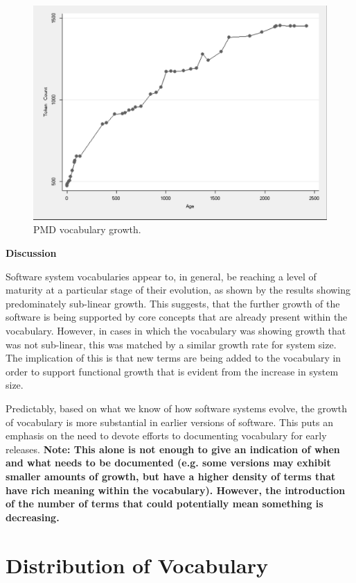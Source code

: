 \begin{figure}[t]
\centering
\includegraphics[width=\textwidth]{Figures/Vocab-PMDGrowth.pdf}
\caption{PMD vocabulary growth.}
\label{fig:vocab-growth-pmd}
\end{figure}

\textbf{Discussion}

Software system vocabularies appear to, in general, be reaching a level of maturity at a particular stage of their evolution, as shown by the results showing predominately sub-linear growth. This suggests, that the further growth of the software is being supported by core concepts that are already present within the vocabulary. However, in cases in which the vocabulary was showing growth that was not sub-linear, this was matched by a similar growth rate for system size. The implication of this is that new terms are being added to the vocabulary in order to support functional growth that is evident from the increase in system size.

Predictably, based on what we know of how software systems evolve, the growth of vocabulary is more substantial in earlier versions of software. This puts an emphasis on the need to devote efforts to documenting vocabulary for early releases. \textbf{Note: This alone is not enough to give an indication of when and what needs to be documented (e.g. some versions may exhibit smaller amounts of growth, but have a higher density of terms that have rich meaning within the vocabulary). However, the introduction of the number of terms that could potentially mean something is decreasing.}

\section{Distribution of Vocabulary} %
\label{sec:distribution_of_vocabulary}

